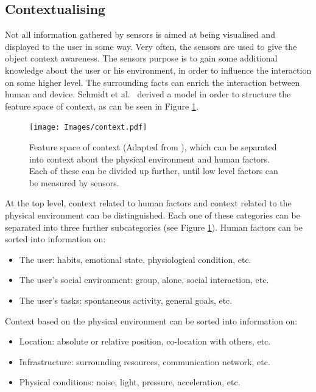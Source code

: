\subsection{Contextualising}
Not all information gathered by sensors is aimed at being visualised and displayed to the user in some way. 
Very often, the sensors are used to give the object context awareness.
The sensors purpose is to gain some additional knowledge about the user or his environment, in order to influence the interaction on some higher level. 
The surrounding facts can enrich the interaction between human and device. 
Schmidt et al.\ \cite{schmidt99} derived a model in order to structure the feature space of context, as can be seen in Figure \ref{fig:context}.

\begin{figure}[!t]
	\centering
	\texttt{[image: Images/context.pdf]}
	\caption{Feature space of context (Adapted from \cite{schmidt99}), which can be separated into context about the physical environment and human factors. Each of these can be divided up further, until low level factors can be measured by sensors.}
	\label{fig:context}
\end{figure}

At the top level, context related to human factors and context related to the physical environment can be distinguished. Each one of these categories can be separated into three further subcategories (see Figure \ref{fig:context}). Human factors can be sorted into information on:

\begin{itemize}
	\item The user: habits, emotional state, physiological condition, etc.
	\item The user's social environment: group, alone, social interaction, etc.
	\item The user's tasks: spontaneous activity, general goals, etc.
\end{itemize}

Context based on the physical environment can be sorted into information on:
\begin{itemize}
	\item Location: absolute or relative position, co-location with others, etc.
	\item Infrastructure: surrounding resources, communication network, etc.
	\item Physical conditions: noise, light, pressure, acceleration, etc.
\end{itemize}

